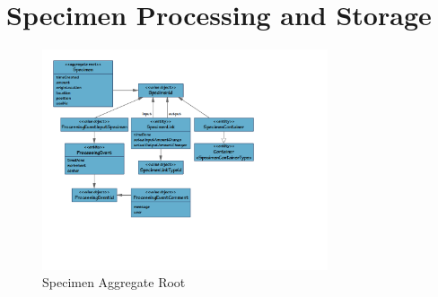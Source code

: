\chapter{Specimen Processing and Storage}

\begin{figure}[H]
  \centering
  \includegraphics[trim={10mm 50mm 72mm 10mm}, clip,
    width=0.75\textwidth]{images/specimen}
  \caption{Specimen Aggregate Root}
  \label{fig:specimen}
\end{figure}

